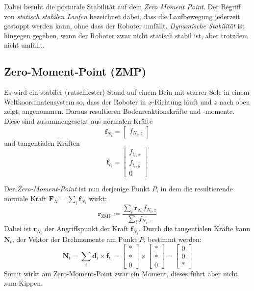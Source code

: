 \documentclass[a4paper, 11pt, accentcolor = tud3b]{tudreport}
\renewcommand{\vec}[1]{\boldsymbol{\mathbf{#1}}}
\begin{document}
			Dabei beruht die posturale Stabilität auf dem \emph{Zero Moment Point}. Der Begriff von \emph{statisch stabilen Laufen} bezeichnet dabei, dass die Laufbewegung jederzeit gestoppt werden kann, ohne dass der Roboter umfällt. \emph{Dynamische Stabilität} ist hingegen gegeben, wenn der Roboter zwar nicht statisch stabil ist, aber trotzdem nicht umfällt.

			\subsection{Zero-Moment-Point (ZMP)}
				Es wird ein stabiler (rutschfester) Stand auf einem Bein mit starrer Sole in einem Weltkoordinatensystem so, dass der Roboter in \(x\)-Richtung läuft und \(z\) nach oben zeigt, angenommen. Daraus resultieren Bodenreaktionskräfte und -momente. Diese sind zusammengesetzt aus normalen Kräfte
				\begin{equation*}
					\vec{f}_{N_i} =
						\begin{bmatrix}
							f_{N_i, z}
						\end{bmatrix}
				\end{equation*}
				und tangentialen Kräften
				\begin{equation*}
					\vec{f}_{t_i} =
						\begin{bmatrix}
							f_{t_i, x} \\
							f_{t_i, y} \\
							0
						\end{bmatrix}
				\end{equation*}
				
				Der \emph{Zero-Moment-Point} ist nun derjenige Punkt \(P\), in dem die resultierende normale Kraft \( \vec{F}_N = \sum_i \vec{f}_{N_i} \) wirkt:
				\begin{equation*}
					\vec{r}_\text{ZMP} \coloneqq \frac{\sum_i \vec{r}_{N_i} f_{N_i, z}}{\sum_i f_{N_i, z}}
				\end{equation*}
				Dabei ist \( \vec{r}_{N_i} \) der Angriffspunkt der Kraft \( \vec{f}_{N_i} \). Durch die tangentialen Kräfte kann \( \vec{N}_t \), der Vektor der Drehmomente am Punkt \(P\), bestimmt werden:
				\begin{equation*}
					\vec{N}_t = \sum_i \vec{d}_i \times \vec{f}_{t_i} =
						\begin{bmatrix}
							\ast \\
							\ast \\
							0
						\end{bmatrix}
					\times
						\begin{bmatrix}
							\ast \\
							\ast \\
							0
						\end{bmatrix}
					=
						\begin{bmatrix}
							0 \\
							0 \\
							\ast
						\end{bmatrix}
				\end{equation*}
				Somit wirkt am Zero-Moment-Point zwar ein Moment, dieses führt aber nicht zum Kippen.
				
\end{document}
